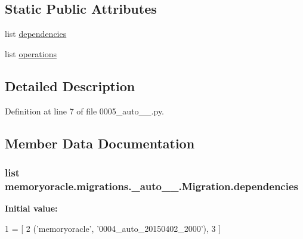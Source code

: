 \subsection*{Static Public Attributes}
\begin{DoxyCompactItemize}
\item 
list \hyperlink{classmemoryoracle_1_1migrations_1_10005__auto__20150403__0100_1_1Migration_af23519f13c779b21cb2f9e653f499f7a}{dependencies}
\item 
list \hyperlink{classmemoryoracle_1_1migrations_1_10005__auto__20150403__0100_1_1Migration_abf5a9879371a9a8c7a622e36323d7115}{operations}
\end{DoxyCompactItemize}


\subsection{Detailed Description}


Definition at line 7 of file 0005\+\_\+auto\+\_\+\_.\+py.



\subsection{Member Data Documentation}
\hypertarget{classmemoryoracle_1_1migrations_1_10005__auto__20150403__0100_1_1Migration_af23519f13c779b21cb2f9e653f499f7a}{}
\subsubsection[{dependencies}]{\setlength{\rightskip}{0pt plus 5cm}list memoryoracle.\+migrations.\+\_\+auto\+\_\+\_.\+Migration.\+dependencies\hspace{0.3cm}{\ttfamily [static]}}\label{classmemoryoracle_1_1migrations_1_10005__auto__20150403__0100_1_1Migration_af23519f13c779b21cb2f9e653f499f7a}
{\bfseries Initial value\+:}
\begin{DoxyCode}
1 = [
2         (\textcolor{stringliteral}{'memoryoracle'}, \textcolor{stringliteral}{'0004\_auto\_20150402\_2000'}),
3     ]
\end{DoxyCode}


